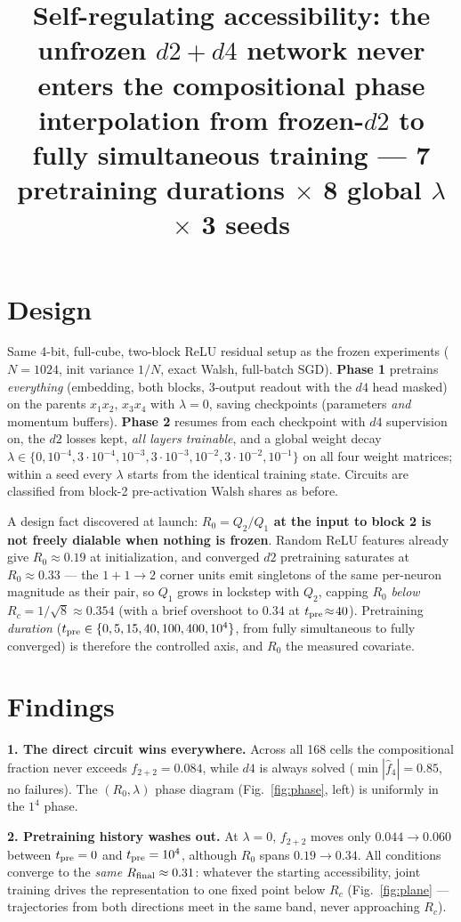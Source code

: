 \documentclass[10pt]{article}
\title{\vspace{-1.4cm}Self-regulating accessibility: the unfrozen $d2{+}d4$ network never
enters the compositional phase\\
\large interpolation from frozen-$d2$ to fully simultaneous training --- 7 pretraining
durations $\times$ 8 global $\lambda$ $\times$ 3 seeds}
\author{}\date{\vspace{-1.2cm}}
\begin{document}
\maketitle\vspace{-1.9cm}

\section*{Design}
Same 4-bit, full-cube, two-block ReLU residual setup as the frozen experiments
($N{=}1024$, init variance $1/N$, exact Walsh, full-batch SGD). \textbf{Phase 1} pretrains
\emph{everything} (embedding, both blocks, 3-output readout with the $d4$ head masked) on the
parents $x_1x_2,\,x_3x_4$ with $\lambda=0$, saving checkpoints (parameters \emph{and} momentum
buffers). \textbf{Phase 2} resumes from each checkpoint with $d4$ supervision on, the $d2$
losses kept, \emph{all layers trainable}, and a global weight decay
$\lambda\in\{0,10^{-4},3{\cdot}10^{-4},10^{-3},3{\cdot}10^{-3},10^{-2},3{\cdot}10^{-2},10^{-1}\}$
on all four weight matrices; within a seed every $\lambda$ starts from the identical training
state. Circuits are classified from block-2 pre-activation Walsh shares as before.

A design fact discovered at launch: \textbf{$R_0=Q_2/Q_1$ at the input to block 2 is not freely
dialable when nothing is frozen}. Random ReLU features already give $R_0\approx0.19$ at
initialization, and converged $d2$ pretraining saturates at $R_0\approx0.33$ --- the
$1{+}1\!\to\!2$ corner units emit singletons of the same per-neuron magnitude as their pair, so
$Q_1$ grows in lockstep with $Q_2$, capping $R_0$ \emph{below} $R_c=1/\sqrt8\approx0.354$
(with a brief overshoot to $0.34$ at $t_{\rm pre}\!\approx\!40$). Pretraining \emph{duration}
($t_{\rm pre}\in\{0,5,15,40,100,400,10^4\}$, from fully simultaneous to fully converged) is
therefore the controlled axis, and $R_0$ the measured covariate.

\section*{Findings}
\textbf{1. The direct circuit wins everywhere.} Across all 168 cells the compositional fraction
never exceeds $f_{2+2}=0.084$, while $d4$ is always solved ($\min|\hat f_4|=0.85$, no
failures). The $(R_0,\lambda)$ phase diagram (Fig.~\ref{fig:phase}, left) is uniformly in the
$1^4$ phase.

\textbf{2. Pretraining history washes out.} At $\lambda=0$, $f_{2+2}$ moves only
$0.044\to0.060$ between $t_{\rm pre}=0$ and $t_{\rm pre}=10^4$, although $R_0$ spans
$0.19\to0.34$. All conditions converge to the \emph{same} $R_{\rm final}\approx0.31$: whatever
the starting accessibility, joint training drives the representation to one fixed point below
$R_c$ (Fig.~\ref{fig:plane} --- trajectories from both directions meet in the same band,
never approaching $R_c$).
\end{document}
